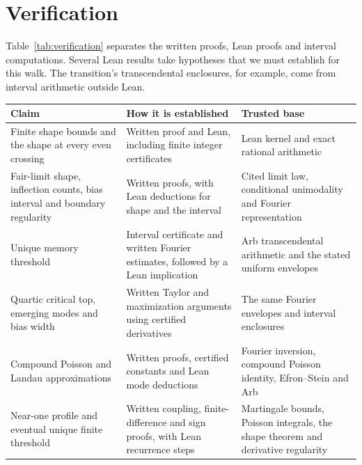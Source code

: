 \section{Verification}\label{sec:verify}

Table~\ref{tab:verification} separates the written proofs, Lean proofs
and interval computations. Several Lean results take hypotheses that
we must establish for this walk. The transition's transcendental
enclosures, for example, come from interval arithmetic outside Lean.

\begin{center}\small
\captionsetup{hypcap=false}
\begin{tabular}{p{}p{}p{}}
\toprule
Claim & How it is established & Trusted base\\
\midrule
Finite shape bounds and the shape at every even crossing &
Written proof and Lean, including finite integer certificates &
Lean kernel and exact rational arithmetic\\[5pt]
Fair-limit shape, inflection counts, bias interval and boundary regularity &
Written proofs, with Lean deductions for shape and the interval &
Cited limit law, conditional unimodality and Fourier representation\\[5pt]
Unique memory threshold &
Interval certificate and written Fourier estimates, followed by a Lean implication &
Arb transcendental arithmetic and the stated uniform envelopes\\[5pt]
Quartic critical top, emerging modes and bias width &
Written Taylor and maximization arguments using certified derivatives &
The same Fourier envelopes and interval enclosures\\[5pt]
Compound Poisson and Landau approximations &
Written proofs, certified constants and Lean mode deductions &
Fourier inversion, compound Poisson identity, Efron--Stein and Arb\\[5pt]
Near-one profile and eventual unique finite threshold &
Written coupling, finite-difference and sign proofs, with Lean recurrence steps &
Martingale bounds, Poisson integrals, the shape theorem and derivative regularity\\
\bottomrule
\end{tabular}
\label{tab:verification}
\end{center}

